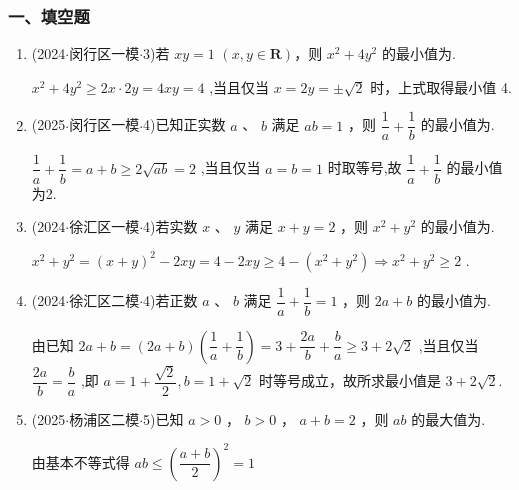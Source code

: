 \subsubsection*{一、填空题}
\begin{enumerate}
    \item (2024$\cdot$闵行区一模$\cdot$3)若 ${xy} = 1$ $(x, y \in  \mathbf{R})$，则 ${x}^{2} + 4{y}^{2}$ 的最小值为.
    \begin{jieda}
        ${x}^{2} + 4{y}^{2} \geq  {2x} \cdot  {2y} = {4xy} = 4$ ,当且仅当 $x = {2y} =  \pm  \sqrt{2}$ 时，上式取得最小值 4.
    \end{jieda}

    \item (2025$\cdot$闵行区一模$\cdot$4)已知正实数 $a$ 、 $b$ 满足 ${ab} = 1$ ，则 $\dfrac{1}{a} + \dfrac{1}{b}$ 的最小值为.
    \begin{jieda}
        $\dfrac{1}{a} + \dfrac{1}{b} = a+b \geq  2\sqrt{ab} = 2$ ,当且仅当 $a = b = 1$ 时取等号,故 $\dfrac{1}{a} + \dfrac{1}{b}$ 的最小值为2.
    \end{jieda}

    \item (2024$\cdot$徐汇区一模$\cdot$4)若实数 $x$ 、 $y$ 满足 $x + y = 2$ ，则 ${x}^{2} + {y}^{2}$ 的最小值为.
    \begin{jieda}
        ${x}^{2} + {y}^{2} = {\left( x + y\right) }^{2} - 2xy = 4 - 2xy \geq 4 - (x^2+y^2) \Longrightarrow  {x}^{2} + {y}^{2} \geq  2$ .
    \end{jieda}

    \item (2024$\cdot$徐汇区二模$\cdot$4)若正数 $a$ 、 $b$ 满足 $\dfrac{1}{a} + \dfrac{1}{b} = 1$ ，则 ${2a} + b$ 的最小值为.
    \begin{jieda}
        由已知 ${2a} + b = \left( {{2a} + b}\right) \left( {\dfrac{1}{a} + \dfrac{1}{b}}\right)  = 3 + \dfrac{2a}{b} + \dfrac{b}{a} \geq 3 + 2\sqrt{2}$ ,当且仅当 $\dfrac{2a}{b} = \dfrac{b}{a}$ ,即 $a = 1 + \dfrac{\sqrt{2}}{2},b = 1 + \sqrt{2}$ 时等号成立，故所求最小值是 $3 + 2\sqrt{2}$.
    \end{jieda}

    \item (2025$\cdot$杨浦区二模$\cdot$5)已知 $a > 0$ ， $b > 0$ ， $a + b = 2$ ，则 ${ab}$ 的最大值为.
    \begin{jieda}
        由基本不等式得 ${ab} \leq  {\left( \dfrac{a + b}{2}\right) }^{2} = 1$
    \end{jieda}


\end{enumerate}
